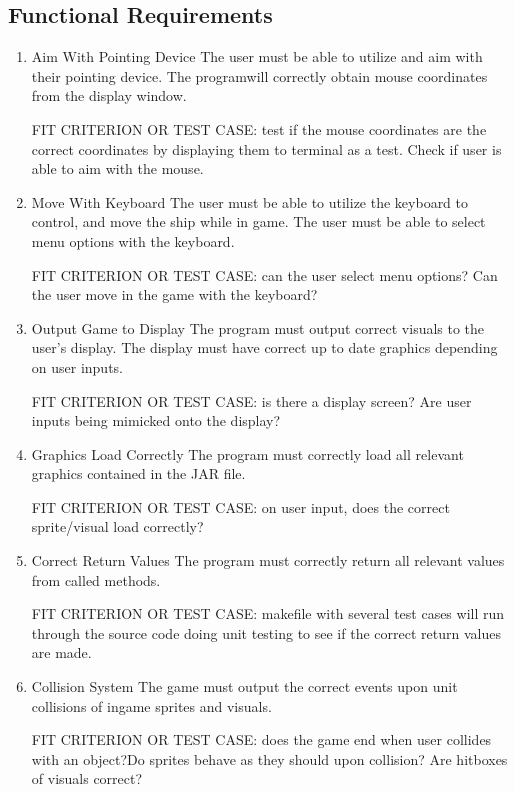 \documentclass[12pt, titlepage]{article}
\begin{document}
\subsection{Functional Requirements}
\begin{enumerate}
\item Aim With Pointing Device
The user must be able to utilize and aim with their pointing device. The
programwill correctly obtain mouse coordinates from the display window.

FIT CRITERION OR TEST CASE: test if the mouse coordinates are the correct
coordinates by displaying them to terminal as a test. Check if user is able to
aim with the mouse.


\item Move With Keyboard
The user must be able to utilize the keyboard to control, and move the ship
while in game. The user must be able to select menu options with the keyboard.

FIT CRITERION OR TEST CASE: can the user select menu options? Can the user move
in the game with the keyboard?


\item Output Game to Display
The program must output correct visuals to the user’s display. The display must
have correct up to date graphics depending on user inputs.

FIT CRITERION OR TEST CASE: is there a display screen? Are user inputs being
mimicked onto the display?


\item Graphics Load Correctly
The program must correctly load all relevant graphics contained in the JAR
file.

FIT CRITERION OR TEST CASE: on user input, does the correct sprite/visual
load correctly?


\item Correct Return Values
The program must correctly return all relevant values from called methods.

FIT CRITERION OR TEST CASE: makefile with several test cases will run through
the source code doing unit testing to see if the correct return values are made.

\item Collision System
The game must output the correct events upon unit collisions of ingame sprites
and visuals.

FIT CRITERION OR TEST CASE: does the game end when user collides with an
object?Do sprites behave as they should upon collision? Are hitboxes of visuals
correct?



\end{enumerate}
\end{document}
